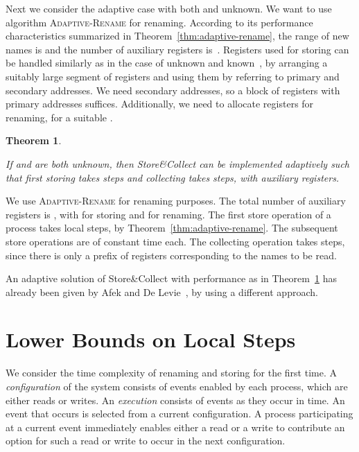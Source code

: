 \documentclass[11pt]{article}
\newcommand{\qed}{\hfill  \smallbreak}
\newenvironment{proof}{\noindent{\bf Proof:}}{\qed}
\newtheorem{theorem}{Theorem}
\begin{document}
Next we consider the adaptive case with both  and  unknown.
We want to use algorithm \textsc{Adaptive-Rename} for renaming. 
According to its performance characteristics summarized in Theorem~\ref{thm:adaptive-rename}, the range of new names is  and the number of auxiliary registers is~.
Registers used for storing can be handled similarly as in the case of unknown  and known~, by arranging a suitably large segment of registers and using them by referring to primary and secondary addresses.
We need  secondary addresses, so a block of registers with  primary addresses suffices.
Additionally, we need to allocate  registers for renaming, for a suitable .


\begin{theorem}
\label{thm:collect-3}

If  and  are both unknown, then Store\&Collect can be implemented adaptively such that first storing takes  steps and collecting takes  steps, with  auxiliary registers.
\end{theorem}

\begin{proof}
We use  \textsc{Adaptive-Rename} for renaming purposes.
The total number of auxiliary registers is , with  for storing and  for renaming. 
The first store operation of a process takes  local steps, by Theorem~\ref{thm:adaptive-rename}.
The subsequent store operations are of constant time each.
The collecting operation takes  steps, since there is only a prefix of  registers corresponding to the names to be read. 
\end{proof}

An adaptive solution of Store\&Collect with performance as in Theorem~\ref{thm:collect-3} has already been given by Afek and De Levie~\cite{AfekL07}, by using a different approach.





\section{Lower Bounds on Local Steps}





We consider the time complexity of renaming and storing for the first time.
A \emph{configuration} of the system consists of events enabled by each process, which are either reads or writes. 
An \emph{execution} consists of events as they occur in time.
An event that occurs is selected from a current configuration. 
A process participating at a current event immediately enables either a read or a  write to contribute an option for such a read or write to occur in the next configuration.
\end{document}
